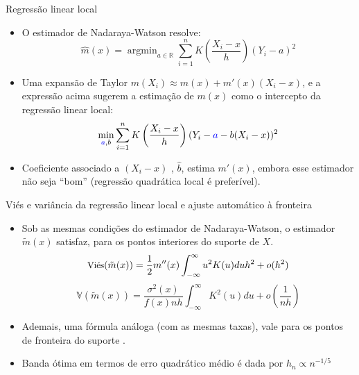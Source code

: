 \documentclass[11pt]{beamer}
\begin{document}
	\begin{frame}{Regressão linear local}
	\begin{itemize}
		\item O estimador de Nadaraya-Watson resolve:
	$$\hat{m}(x) = \operatorname{argmin}_{a \in \mathbb{R}} \sum_{i=1}^n K\left(\frac{X_i-x}{h}\right)(Y_i-a)^2$$
	\item Uma expansão de Taylor $m(X_i) \approx m(x) + m'(x)(X_i-x)$, e a expressão acima sugerem a estimação de $m(x)$ como o intercepto da {\color{blue}regressão linear local}:
	$$\min_{{\color{blue}a},b} \sum_{i=1}^n K\left(\frac{X_i-x}{h}\right)(Y_i-{\color{blue}a} - b(X_i-x))^2$$
	\item Coeficiente associado a $(X_i-x)$ , $\hat{b}$, estima $m'(x)$, embora esse estimador não seja ``bom'' (regressão quadrática local é preferível).
	
	\end{itemize}
\end{frame}
	
	\begin{frame}{Viés e variância da regressão linear local e ajuste automático à fronteira}
	\begin{itemize}
		\item Sob as mesmas condições do estimador de Nadaraya-Watson, o estimador $\tilde{m}(x)$ satisfaz, para os pontos interiores do suporte de $X$.
			$$\small \text{Vi\'{e}s}(\tilde{m}(x)) = \frac{1}{2} m^{\prime \prime}(x) \int_{-\infty}^{\infty} u^{2} K(u) d u h^{2}+ o(h^2)$$
	$$\mathbb{V}(\tilde{m}(x)) = \frac{\sigma^{2}(x)}{f(x) n h} \int_{-\infty}^{\infty} K^{2}(u) d u + o\left(\frac{1}{nh}\right)$$
	\item Ademais, uma fórmula análoga (com as mesmas taxas), vale para os pontos de fronteira do suporte \citep[Teorema 3.3]{Fan1996}.
	\item Banda ótima em termos de erro quadrático médio é dada por $h_n \propto n^{-1/5}$ 
	\end{itemize}
	\end{frame}
	
\end{document}
